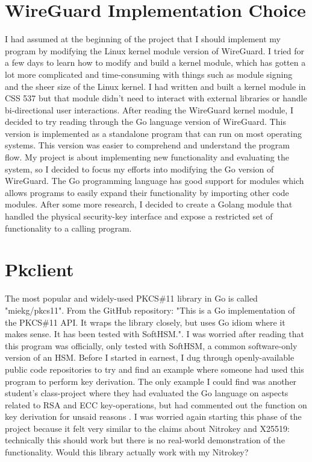 \documentclass [11pt, proquest] {uwthesis}[2020/02/24]
\begin{document}
\section{WireGuard Implementation Choice}
I had assumed at the beginning of the project that I should implement my program by modifying the Linux kernel module version of WireGuard. I tried for a few days to learn how to modify and build a kernel module, which has gotten a lot more complicated and time-consuming with things such as module signing and the sheer size of the Linux kernel. I had written and built a kernel module in CSS 537 but that module didn't need to interact with external libraries or handle bi-directional user interactions. After reading the WireGuard kernel module, I decided to try reading through the Go language version of WireGuard. This version is implemented as a standalone program that can run on most operating systems. This version was easier to comprehend and understand the program flow. My project is about implementing new functionality and evaluating the system, so I decided to focus my efforts into modifying the Go version of WireGuard.
The Go programming language has good support for modules which allows programs to easily expand their functionality by importing other code modules. After some more research, I decided to create a Golang module that handled the physical security-key interface and expose a restricted set of functionality to a calling program. 

\section{Pkclient}
\label{pk_design}
The most popular and widely-used PKCS\#11 library in Go is called "miekg/pkcs11". From the GitHub repository: "This is a Go implementation of the PKCS\#11 API. It wraps the library closely, but uses Go idiom where it makes sense. It has been tested with SoftHSM."\cite{gieben_pkcs11_2022}. 
I was worried after reading that this program was officially, only tested with SoftHSM, a common software-only version of an HSM. Before I started in earnest, I dug through openly-available public code repositories to try and find an example where someone had used this program to perform key derivation. The only example I could find was another student's class-project where they had evaluated the Go language on aspects related to RSA and ECC key-operations, but had commented out the function on key derivation for unsaid reasons \cite{quapka_go-analysis_2019}. I was worried again starting this phase of the project because it felt very similar to the claims about Nitrokey and X25519: technically this should work but there is no real-world demonstration of the functionality. Would this library actually work with my Nitrokey?
\end{document}
